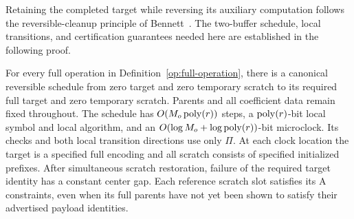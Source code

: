 Retaining the completed target while reversing its auxiliary computation
follows the reversible-cleanup principle of Bennett~\cite[pp.~525--526]{Bennett1973}.
The two-buffer schedule, local transitions, and certification guarantees
needed here are established in the following proof.

\begin{lemma}\label{lem:outer-fill}
For every full operation in Definition~\ref{op:full-operation}, there
is a canonical reversible schedule from zero target and zero temporary
scratch to its required full target and zero temporary scratch.
Parents and all coefficient data remain fixed throughout.  The schedule
has $O(M_o\operatorname{poly}(r))$ steps, a $\operatorname{poly}(r)$-bit local symbol and local
algorithm, and an $O(\log M_o+\log\operatorname{poly}(r))$-bit microclock.
Its checks and both local transition directions use only $\Pi$.
At each clock location the target is a specified full encoding and
all scratch consists of specified initialized prefixes.  After
simultaneous scratch restoration, failure of the required target
identity has a constant center gap.  Each reference scratch slot
satisfies its A constraints, even when its full parents have not yet
been shown to satisfy their advertised payload identities.
\end{lemma}

